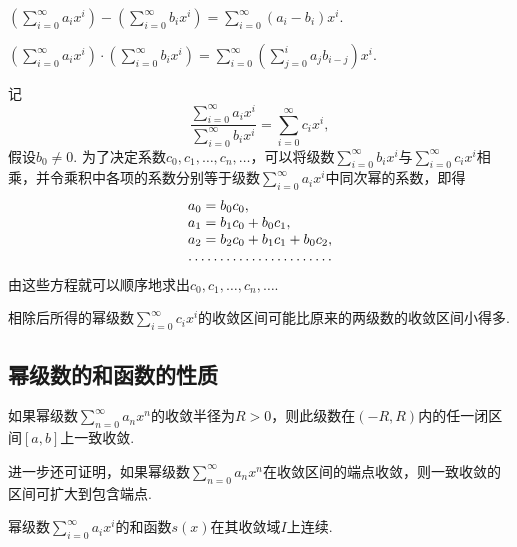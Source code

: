 \begin{definition}[幂级数的减法]
\(\left(\sum\limits_{i=0}^{\infty} a_i x^i\right)
- \left(\sum\limits_{i=0}^{\infty} b_i x^i\right)
= \sum\limits_{i=0}^{\infty} (a_i-b_i) x^i\).
\end{definition}

\begin{definition}[幂级数的乘法]
\(\left(\sum\limits_{i=0}^{\infty} a_i x^i\right)
\cdot \left(\sum\limits_{i=0}^{\infty} b_i x^i\right)
= \sum\limits_{i=0}^{\infty} \left(
	\sum\limits_{j=0}^{i} a_j b_{i-j}
\right) x^i\).
\end{definition}

\begin{definition}[幂级数的除法]
记\[
\frac{
	\sum\limits_{i=0}^{\infty} a_i x^i
}{
	\sum\limits_{i=0}^{\infty} b_i x^i
}
= \sum\limits_{i=0}^{\infty} c_i x^i,
\]假设\(b_0 \neq 0\).
为了决定系数\(c_0,c_1,\dotsc,c_n,\dotsc\)，可以将级数\(\sum\limits_{i=0}^{\infty} b_i x^i\)与\(\sum\limits_{i=0}^{\infty} c_i x^i\)相乘，并令乘积中各项的系数分别等于级数\(\sum\limits_{i=0}^{\infty} a_i x^i\)中同次幂的系数，即得\[
\begin{array}{l}
a_0 = b_0 c_0, \\
a_1 = b_1 c_0 + b_0 c_1, \\
a_2 = b_2 c_0 + b_1 c_1 + b_0 c_2, \\
\hdotsfor{1} \\
\end{array}
\]由这些方程就可以顺序地求出\(c_0,c_1,\dotsc,c_n,\dotsc\).

相除后所得的幂级数\(\sum\limits_{i=0}^{\infty} c_i x^i\)的收敛区间可能比原来的两级数的收敛区间小得多.
\end{definition}

\subsection{幂级数的和函数的性质}
\begin{property}\label{theorem:无穷级数.一致收敛的幂级数的性质}
\def\s{\sum\limits_{n=0}^{\infty}}
如果幂级数\(\s a_n x^n\)的收敛半径为\(R>0\)，则此级数在\((-R,R)\)内的任一闭区间\([a,b]\)上一致收敛.
\end{property}
进一步还可证明，如果幂级数\(\sum\limits_{n=0}^{\infty} a_n x^n\)在收敛区间的端点收敛，则一致收敛的区间可扩大到包含端点.

\begin{property}\label{theorem:无穷级数.幂级数的和函数的性质1}
幂级数\(\sum\limits_{i=0}^{\infty} a_i x^i\)的和函数\(s(x)\)在其收敛域\(I\)上连续.
\end{property}

